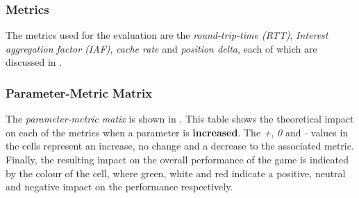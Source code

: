\subsubsection*{Metrics}
The metrics used for the evaluation are the \textit{round-trip-time (RTT)}, \textit{Interest aggregation factor (IAF)}, \textit{cache rate} and \textit{position delta}, each of which are discussed in .

\subsubsection*{Parameter-Metric Matrix}
The \textit{parameter-metric matix} is shown in . This table shows the theoretical impact on each of the metrics when a parameter is \textbf{increased}. The \textit{+}, \textit{0} and \textit{-} values in the cells represent an increase, no change and a decrease to the associated metric. Finally, the resulting impact on the overall performance of the game is indicated by the colour of the cell, where green, white and red indicate a positive, neutral and negative impact on the performance respectively. 

